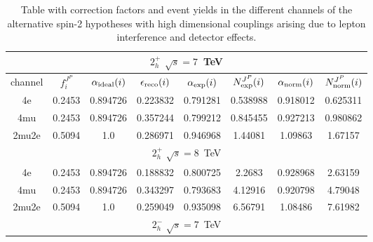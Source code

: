 \begin{table}[b]
\centering
\caption{
Table with correction factors and event yields in the different
channels of the alternative spin-2 hypotheses with high dimensional
couplings arising due to lepton interference and detector effects.}
\begin{tabular}{c c c c c c c c} %
\hline \hline

\multicolumn{8}{|c|}{$2^{+}_{h}$ $\sqrt{s}=7$~TeV} \\ \hline 

channel & $f_{i}^{J^P}$ & $\alpha_{\rm ideal} (i)$ & $\epsilon_{\rm reco} (i)$ & $\alpha_{\rm exp} (i)$ & $N^{J^P}_{\rm exp} (i)$ & $\alpha_{\rm norm} (i)$ & $N^{J^P}_{\rm norm} (i)$\\ \hline 
4e & 0.2453 & 0.894726 & 0.223832 & 0.791281
 & 0.538988%
 & 0.918012 & 0.625311 \\ \hline 
4mu & 0.2453 & 0.894726 & 0.357244 & 0.799212
 & 0.845455%
 & 0.927213 & 0.980862 \\ \hline 
2mu2e & 0.5094 & 1.0  & 0.286971 & 0.946968
 & 1.44081%
 & 1.09863 & 1.67157 \\ \hline \hline 

\multicolumn{8}{|c|}{$2^{+}_{h}$ $\sqrt{s}=8$~TeV} \\ \hline 

4e & 0.2453 & 0.894726 & 0.188832 & 0.800725
 & 2.2683%
 & 0.928968 & 2.63159 \\ \hline 
4mu & 0.2453 & 0.894726 & 0.343297 & 0.793683
 & 4.12916%
 & 0.920798 & 4.79048 \\ \hline 
2mu2e & 0.5094 & 1.0  & 0.259049 & 0.935098
 & 6.56791%
 & 1.08486 & 7.61982 \\ \hline \hline 

 \multicolumn{8}{|c|}{$2^{-}_{h}$ $\sqrt{s}=7$~TeV} \\ \hline 


\end{tabular}
\end{table}
